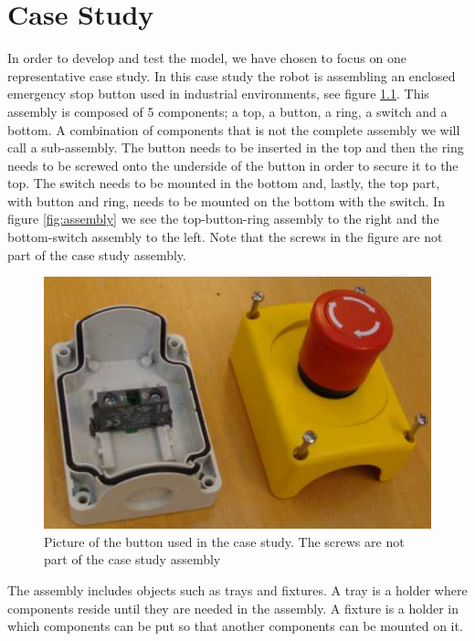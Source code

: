 \chapter{Case Study}\label{cha:assembly}
In order to develop and test the model, we have chosen to focus on one representative case study. In this case study the robot is assembling an enclosed emergency stop button used in industrial environments, see figure \ref{fig:button}. This assembly is composed of 5 components; a top, a button, a ring, a switch and a bottom. A combination of components that is not the complete assembly we will call a sub-assembly. The button needs to be inserted in the top and then the ring needs to be screwed onto the underside of the button in order to secure it to the top. The switch needs to be mounted in the bottom and, lastly, the top part, with button and ring, needs to be mounted on the bottom with the switch. In figure \ref{fig:assembly} we see the top-button-ring assembly to the right and the bottom-switch assembly to the left. Note that the screws in the figure are not part of the case study assembly.

\begin{figure}
\centering
\includegraphics[width=\textwidth/3*2]{Figures/buttonbox.png}
\caption{Picture of the button used in the case study. The screws are not part of the case study assembly}
\label{fig:button}
\end{figure}

The assembly includes objects such as trays and fixtures. A tray is a holder where components reside until they are needed in the assembly. A fixture is a holder in which components can be put so that another components can be mounted on it.

